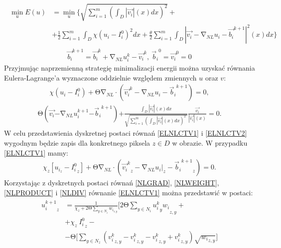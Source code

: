 \documentclass[12pt, twoside, openany]{report}
\theoremstyle{definition}
\begin{document}
\begin{align}
\begin{aligned}
\mathop{\mathrm{min}}_{u}E\left(u\right) &= \mathop{\mathrm{min}}_{u}\Biggl\{\sqrt{\sum^m_{i=1}{{\left(\int_D{\left|\overrightarrow{v_i}\right|(x)}dx\right)}^2}}+\\ 
&+\frac{1}{2}\sum^m_{i=1}{\int_D{ \chi {\left(u_i-I^0_i\right)}^2}dx} 
+\frac{\theta }{2}\sum^m_{i=1}{\int_D{{\left|\overrightarrow{v_i}-{\mathrm{\nabla }}_{NL}u_i- {\overrightarrow{b_i}}^{k+1}\right|}^2\left(x\right)}dx}\Biggr\}
\end{aligned}
\label{ENLCTV1}
\end{align}
\begin{align}
{\overrightarrow{b_i}}^{k+1}={\overrightarrow{b_i}}^k+{\mathrm{\nabla }}_{NL}u^k_i-{\overrightarrow{v_i}}^k,\ {{\overrightarrow{b}}_i}^0={\overrightarrow{v_i}}^0=0
\label{ENLCTV2}
\end{align}
Przyjmując naprzemienną strategię minimalizacji energii można uzyskać równania Eulera-Lagrange’a wyznaczone oddzielnie względem zmiennych $u$ oraz $v$:
\begin{align}
\chi \left(u_i-I^0_i\right)+\mathrm{\Theta }{\mathrm{\nabla }}_{NL}\cdot \left({\overrightarrow{v_i}}^k-{\mathrm{\nabla }}_{NL}u_i-{{\overrightarrow{b}}_i}^{k+1}\right)=0,
\label{ELNLCTV1}
\end{align}
\begin{align}
\mathrm{\Theta }\left(\overrightarrow{v_i}\mathrm{-}{\mathrm{\nabla }}_{NL}u^{k+1}_i\mathrm{-}{{\overrightarrow{b}}_i}^{k+1}\right)\mathrm{+}\frac{\int_D{\left|\overrightarrow{v_i}\right|(x)}dx}{\sqrt{\sum^m_{i=1}{{\left(\int_D{\left|\overrightarrow{v_i}\right|(x)}dx\right)}^2}\ }}\frac{\overrightarrow{v_i}}{\left|\overrightarrow{v_i}\right|(x)}\mathrm{=0}.
\label{ELNLCTV2}
\end{align}
W celu przedstawienia dyskretnej postaci równań \eqref{ELNLCTV1} i \eqref{ELNLCTV2} wygodnym będzie zapis dla konkretnego piksela $z\in D$ w obrazie. W przypadku \eqref{ELNLCTV1} mamy: 
\begin{align}
\chi_z \left[u_{i_z}-{I^0_i}_z\right]+\mathrm{\Theta}{\mathrm{\nabla}}_{NL}\cdot \left({{\overrightarrow{v_i}}^k}_z-{{\mathrm{\nabla}}_{NL}u_i}\big|_z-{{{\overrightarrow{b}}_i}^{k+1}}_z\right)=0.
\label{DELNLCTV1}
\end{align}
Korzystając z dyskretnych postaci równań \eqref{NLGRAD}, \eqref{NLWEIGHT}, \eqref{NLPRODUCT} i \eqref{NLDIV} równanie \eqref{ELNLCTV1} można przedstawić w postaci:
\begin{align}
\begin{aligned}
{u^{k+1}_i}_{z} &= \frac{1}{\chi_z+2\mathrm{\Theta} \sum\limits_{y\in N_i} w_{i_{z,y}}} \Biggl[2\mathrm{\Theta }\sum_{y\in N_i} {{{u^k_i}_y w_i}_{z,y}}+\\
&+ \chi_z \ {I^0_i}_z -\\
&-\mathrm{\Theta} \Biggl[\sum_{y\in N_z} \left({ v^k_i}_{z,y} - { v^k_i}_{z,y} - { v^k_i}_{z,y} + { v^k_i}_{z,y}\right) \sqrt{{w_i}_{z,y}} \Biggr]
\end{aligned}
\label{uNLCTV}
\end{align}
\end{document}
